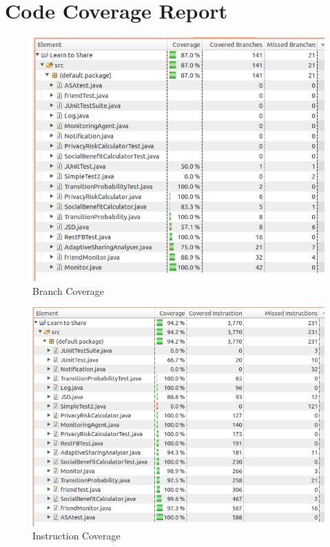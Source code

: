 \documentclass[a4paper,11pt]{article}
\begin{document}
\section{Code Coverage Report}
\setcounter{figure}{0} 
\begin{figure}[H]
	\centering
	\includegraphics[scale=0.653]{APpendix/BranchCoverage}
	\caption{Branch Coverage}
\end{figure}


\begin{figure}[H]
	\centering
	\includegraphics[scale=0.60]{APpendix/InstructionCoverage}
	\caption{Instruction Coverage}
\end{figure}
\end{document}
